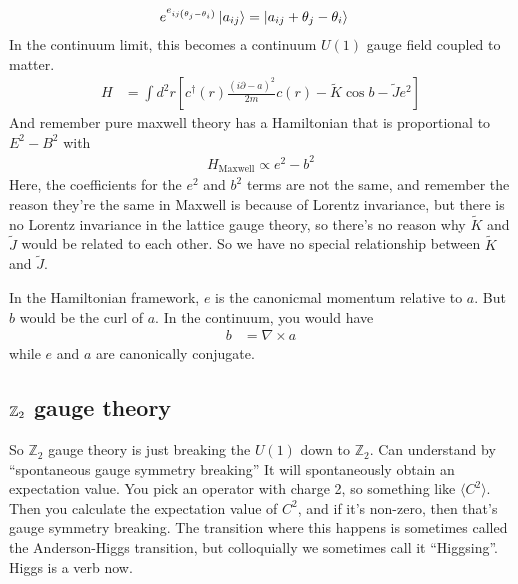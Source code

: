 \begin{align}
    e^{e_{ij\left( \theta_j - \theta_i \right)}}\ket{a_{ij}}
    &=
    \ket{a_{ij} + \theta_j - \theta_i}
\end{align}
In the continuum limit,
this becomes a continuum $U(1)$ gauge field coupled to matter.
\begin{align}
    H &=
    \int d^2 r
    \left[ 
    c^\dagger (r)
    \frac{\left( i\partial - a \right)^2}{2m}
    c(r)
    -
    \tilde{K} \cos b
    - \tilde{J} e^2
    \right]
\end{align}
And remember pure maxwell theory has a Hamiltonian that is proportional to $E^2
- B^2$ with
\begin{align}
    H_{\text{Maxwell}}
    \propto e^2 - b^2
\end{align}
Here,
the coefficients for the $e^2$ and $b^2$ terms are not the same,
and remember the reason they're the same in Maxwell is because of Lorentz
invariance,
but there is no Lorentz invariance in the lattice gauge theory,
so there's no reason why $\tilde{K}$ and $\tilde{J}$ would be related to each
other.
So we have no special relationship between $\tilde{K}$ and $\tilde{J}$.

In the Hamiltonian framework,
$e$ is the canonicmal momentum relative to $a$.
But $b$ would be the curl of $a$.
In the continuum,
you would have
\begin{align}
    b &= \nabla\times a
\end{align}
while $e$ and $a$ are canonically conjugate.

\subsection{$\mathbb{Z}_2$ gauge theory}
So $\mathbb{Z}_2$ gauge theory is just breaking the $U(1)$ down to
$\mathbb{Z}_2$.
Can understand by ``spontaneous gauge symmetry breaking''
It will spontaneously obtain an expectation value.
You pick an operator with charge 2,
so something like $\langle C^2 \rangle$.
Then you calculate the expectation value of $C^2$,
and if it's non-zero,
then that's gauge symmetry breaking.
The transition where this happens is sometimes called the Anderson-Higgs
transition,
but colloquially we sometimes call it ``Higgsing''.
Higgs is a verb now.

